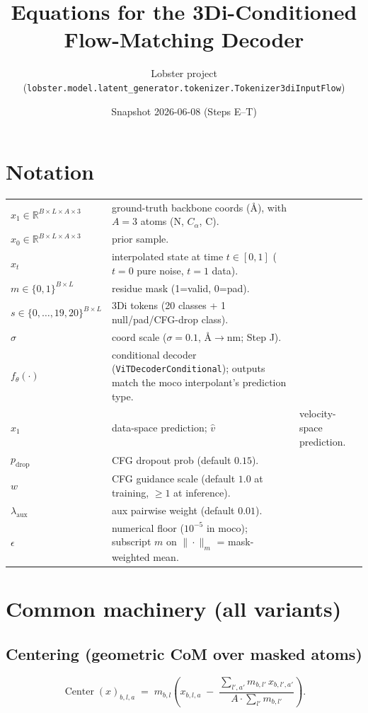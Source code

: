 \documentclass[11pt]{article}
\title{Equations for the 3Di-Conditioned Flow-Matching Decoder}
\author{Lobster project (\texttt{lobster.model.latent\_generator.tokenizer.Tokenizer3diInputFlow})}
\date{Snapshot 2026-06-08 (Steps E--T)}
\begin{document}
\maketitle

\section*{Notation}

\begin{tabular}{ll}
\toprule
$x_1 \in \mathbb{R}^{B\times L \times A \times 3}$ & ground-truth backbone coords (\AA), with $A=3$ atoms (N, $C_\alpha$, C).\\
$x_0 \in \mathbb{R}^{B\times L \times A \times 3}$ & prior sample.\\
$x_t$ & interpolated state at time $t \in [0,1]$ ($t=0$ pure noise, $t=1$ data).\\
$m \in \{0,1\}^{B\times L}$ & residue mask (1=valid, 0=pad).\\
$s \in \{0,\dots,19,20\}^{B\times L}$ & 3Di tokens (20 classes + 1 null/pad/CFG-drop class).\\
$\sigma$ & coord scale ($\sigma=0.1$, \AA{}$\to$nm; Step J).\\
$f_\theta(\cdot)$ & conditional decoder (\texttt{ViTDecoderConditional}); outputs match the moco interpolant's prediction type.\\
$\hat{x}_1$ & data-space prediction; $\hat{v}$ & velocity-space prediction.\\
$p_{\text{drop}}$ & CFG dropout prob (default $0.15$).\\
$w$ & CFG guidance scale (default $1.0$ at training, $\geq 1$ at inference).\\
$\lambda_{\text{aux}}$ & aux pairwise weight (default $0.01$).\\
$\epsilon$ & numerical floor ($10^{-5}$ in moco); subscript $m$ on $\|\cdot\|_m$ = mask-weighted mean.\\
\bottomrule
\end{tabular}

\section{Common machinery (all variants)}

\subsection{Centering (geometric CoM over masked atoms)}
\begin{equation}
\operatorname{Center}(x)_{b,l,a} \;=\; m_{b,l}\!\left(x_{b,l,a} \;-\; \frac{\sum_{l',a'} m_{b,l'} \, x_{b,l',a'}}{A \cdot \sum_{l'} m_{b,l'}}\right).
\end{equation}
\end{document}
